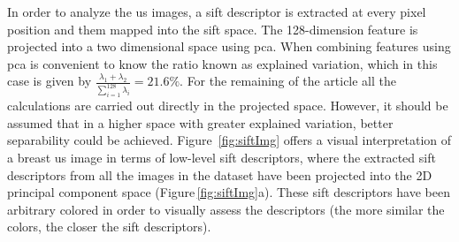 \documentclass[a4paper, 10pt, conference]{llncs}      %
\begin{document}
In order to analyze the \ac{us} images, a \ac{sift} descriptor is extracted at every pixel position and them mapped into the \ac{sift} space. The 128-dimension feature is projected into a two dimensional space using \ac{pca}.
%
%
When combining features using \ac{pca} is convenient to know the ratio known as explained variation, which in this case is given by $\frac{\lambda_1+\lambda_2}{\sum_{i=1}^{128}\lambda_i}=21.6\%$. %
For the remaining of the article all the calculations are carried out directly in the projected space. However, it should be assumed that in a higher space with greater explained variation, better separability could be achieved.
Figure~\ref{fig:siftImg} offers a visual interpretation of a breast \ac{us} image in terms of low-level \ac{sift} descriptors, where the extracted \ac{sift} descriptors from all the images in the dataset have been projected into the 2D principal component space (Figure\,\ref{fig:siftImg}a). These \ac{sift} descriptors have been arbitrary colored in order to visually assess the descriptors (the more similar the colors, the closer the \ac{sift} descriptors).
%
%
%
%
\end{document}

